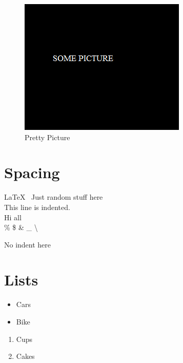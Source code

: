 \documentclass[a4paper,12pt]{book}
\begin{document}
\begin{figure}
\centering
\includegraphics[width=\linewidth]{pic1.png}
\caption{Pretty Picture}\label{fig:pic new}
\end{figure}

\blindtext[3]

\endgroup

\section*{Spacing}
\LaTeX\
Just random stuff here \\
This line is indented.\\[50pt]
Hi all\\

\% \$ \& \_ \textbackslash

\noindent
No indent here


\newpage

\section[Title in Table of contents here]{Lists}

\begin{itemize}
\item Cars
\item Bike
\end{itemize}


\begin{enumerate}[label=\Roman*, font=\bfseries]
\item Cups
\item Cakes
\end{enumerate}
\end{document}
